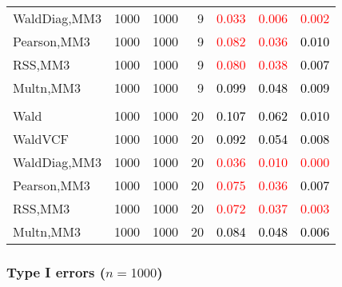 \documentclass[
]{article}
\begin{document}
\begin{table}[H]
{\begin{tabular}[t]{lrrrrrr}
\hspace{1em}WaldDiag,MM3 & 1000 & 1000 & 9 & \textcolor{red}{0.033} & \textcolor{red}{0.006} & \textcolor{red}{0.002}\\
\hspace{1em}Pearson,MM3 & 1000 & 1000 & 9 & \textcolor{red}{0.082} & \textcolor{red}{0.036} & \textcolor{black}{0.010}\\
\hspace{1em}RSS,MM3 & 1000 & 1000 & 9 & \textcolor{red}{0.080} & \textcolor{red}{0.038} & \textcolor{black}{0.007}\\
\hspace{1em}Multn,MM3 & 1000 & 1000 & 9 & \textcolor{black}{0.099} & \textcolor{black}{0.048} & \textcolor{black}{0.009}\\
\addlinespace[0.3em]
\multicolumn{7}{l}{\textbf{3F 15V}}\\
\hspace{1em}Wald & 1000 & 1000 & 20 & \textcolor{black}{0.107} & \textcolor{black}{0.062} & \textcolor{black}{0.010}\\
\hspace{1em}WaldVCF & 1000 & 1000 & 20 & \textcolor{black}{0.092} & \textcolor{black}{0.054} & \textcolor{black}{0.008}\\
\hspace{1em}WaldDiag,MM3 & 1000 & 1000 & 20 & \textcolor{red}{0.036} & \textcolor{red}{0.010} & \textcolor{red}{0.000}\\
\hspace{1em}Pearson,MM3 & 1000 & 1000 & 20 & \textcolor{red}{0.075} & \textcolor{red}{0.036} & \textcolor{black}{0.007}\\
\hspace{1em}RSS,MM3 & 1000 & 1000 & 20 & \textcolor{red}{0.072} & \textcolor{red}{0.037} & \textcolor{red}{0.003}\\
\hspace{1em}Multn,MM3 & 1000 & 1000 & 20 & \textcolor{black}{0.084} & \textcolor{black}{0.048} & \textcolor{black}{0.006}\\
\bottomrule
\end{tabular}}
\endgroup{}
\end{table}

\subsubsection{\texorpdfstring{Type I errors
(\(n=1000\))}{Type I errors (n=1000)}}\label{type-i-errors-n1000-2}
\end{document}
